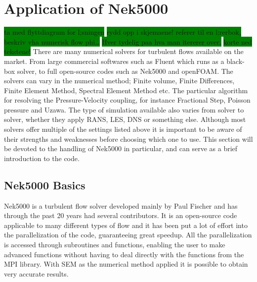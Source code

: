
\chapter{Application of Nek5000} %

\label{nek} %




\colorbox{green}{ta med flyttdiagram for l;sningen}
\colorbox{green}{rydd opp i skjemaene! referer til en l;rerbok, beskriv vha numerisk flow phi\ldots }
\colorbox{green}{Hver tydelig paa hva man itererer over.}
\colorbox{green}{korte ned tekstene!}
There are many numerical solvers for turbulent flows available on the market.
From large commercial softwares such as Fluent which runs as a 
black-box solver, to full open-source codes such as Nek5000 and openFOAM. 
The solvers can vary in the numerical method; Finite volume, Finite Differences, 
Finite Element Method, Spectral Element Method etc. The particular algorithm 
for resolving the Pressure-Velocity coupling, for instance Fractional Step, Poisson pressure and 
Uzawa. The type of simulation available also varies from solver to solver, whether
they apply RANS, LES, DNS or something else. Although most solvers offer multiple of the settings
listed above it is important to be aware of their strengths and weaknesses before choosing which 
one to use. This section will be devoted to the handling of Nek5000 in particular, and can serve
as a brief introduction to the code.

\section{Nek5000 Basics}

Nek5000 is a turbulent flow solver developed mainly by Paul Fischer
and has through the past 20 years had several contributors. 
It is an open-source code applicable to many different types of flow 
and it has been put a lot of effort into the parallelization of the code, 
guaranteeing great speedup. All the parallelization is accessed through subroutines
and functions, enabling the user to make advanced functions without having to 
deal directly with the functions from the MPI library.
With SEM as the numerical method applied it is possible to obtain very accurate results.  

